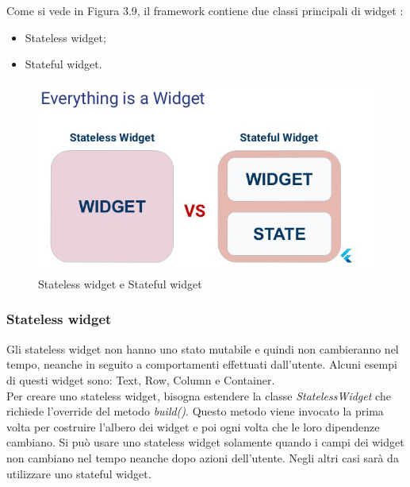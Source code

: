 \newpage

\noindent Come si vede in Figura 3.9, il framework contiene due classi principali di widget \cite{ flutterd, state}: 
\begin{itemize}
	\item Stateless widget;   
	\item Stateful widget.
\end{itemize}

\begin{figure}[htbp]	
	\centering
	\includegraphics[width=12cm]{immagini/state.jpeg}
	\caption{Stateless widget e Stateful widget \cite{state}}
	\label{fig:Stateless widget e Stateful widget}
\end{figure}
\subsubsection{Stateless widget}
Gli stateless widget non hanno uno stato mutabile e quindi non cambieranno nel tempo, neanche in seguito a comportamenti effettuati dall'utente.
Alcuni esempi di questi widget sono: Text, Row, Column e Container.\\
Per creare uno stateless widget, bisogna estendere la classe \textit{StatelessWidget} che richiede l'override del metodo \textit{build()}.
Questo metodo viene invocato la prima volta per costruire l'albero dei widget e poi ogni volta che le loro dipendenze cambiano.
Si può usare uno stateless widget solamente quando i campi dei widget non cambiano nel tempo neanche dopo azioni dell'utente.
Negli altri casi sarà da utilizzare uno stateful widget.


